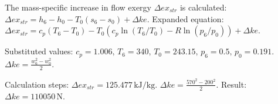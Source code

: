 The mass-specific increase in flow exergy \( \Delta ex_{str} \) is calculated:  
\( \Delta ex_{str} = h_6 - h_0 - T_0 \left( s_6 - s_0 \right) + \Delta ke \).  
Expanded equation:  
\( \Delta ex_{str} = c_p \left( T_6 - T_0 \right) - T_0 \left( c_p \ln \left( T_6 / T_0 \right) - R \ln \left( p_6 / p_0 \right) \right) + \Delta ke \).  

Substituted values:  
\( c_p = 1.006, \, T_6 = 340, \, T_0 = 243.15, \, p_6 = 0.5, \, p_0 = 0.191 \).  
\( \Delta ke = \frac{w_6^2 - w_0^2}{2} \).  

Calculation steps:  
\( \Delta ex_{str} = 125.477 \, \text{kJ/kg} \).  
\( \Delta ke = \frac{570^2 - 200^2}{2} \).  
Result: \( \Delta ke = 110050 \, \text{N} \).